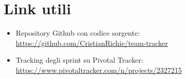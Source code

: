 \documentclass[a4paper,12pt]{extarticle}
\begin{document}





\section{Link utili}
\begin{itemize}
    \item Repository Github con codice sorgente: \\ \href{https://github.com/CristianRichie/team-tracker}{https://github.com/CristianRichie/team-tracker}
    \item Tracking degli sprint su Pivotal Tracker: \\ \href{https://www.pivotaltracker.com/n/projects/2327215}{https://www.pivotaltracker.com/n/projects/2327215}
\end{itemize}
\end{document}
